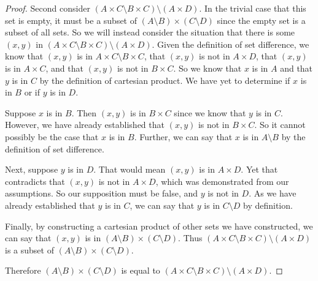\documentclass[main.tex]{subfiles}
\begin{document}
\begin{proof}
	\medskip
	Second consider
	\((A \times C \setminus B \times C) \setminus (A \times D)\). In the
	trivial case that this set is empty, it must be a subset of
	\((A \setminus B) \times (C \setminus D)\) since the empty set is a
	subset of all sets. So we will instead consider the situation that there
	is some \((x,y)\) in
	\((A \times C \setminus B \times C) \setminus (A \times D)\). Given the
	definition of set difference, we know that \((x,y)\) is in
	\(A \times C \setminus B \times C\), that \((x,y)\) is not in
	\(A \times D\), that \((x,y)\) is in \(A \times C\), and that \((x,y)\)
	is not in \(B \times C\). So we know that \(x\) is in \(A\) and that
	\(y\) is in \(C\) by the definition of cartesian product. We have yet
	to determine if \(x\) is in \(B\) or if \(y\) is in \(D\).

	Suppose \(x\) is in \(B\). Then \((x,y)\) is in \(B \times C\) since we
	know that \(y\) is in \(C\). However, we have already established that
	\((x,y)\) is not in \(B \times C\). So it cannot possibly be the case
	that \(x\) is in \(B\). Further, we can say that \(x\) is in
	\(A \setminus B\) by the definition of set difference.

	Next, suppose \(y\) is in \(D\). That would mean \((x,y)\) is in
	\(A \times D\). Yet that contradicts that \((x,y)\) is not in
	\(A \times D\), which was demonstrated from our assumptions. So our
	supposition must be false, and \(y\) is not in \(D\). As we have already
	established that \(y\) is in \(C\), we can say that \(y\) is in
	\(C \setminus D\) by definition.

	Finally, by constructing a cartesian product of other sets we have
	constructed, we can say that \((x,y)\) is in
	\((A \setminus B) \times (C \setminus D)\). Thus
	\((A \times C \setminus B \times C) \setminus (A \times D)\) is a subset
	of \((A \setminus B) \times (C \setminus D)\).

	\medskip
	Therefore \((A \setminus B) \times (C \setminus D)\) is equal to
	\((A \times C \setminus B \times C) \setminus (A \times D)\).
\end{proof}
\end{document}
